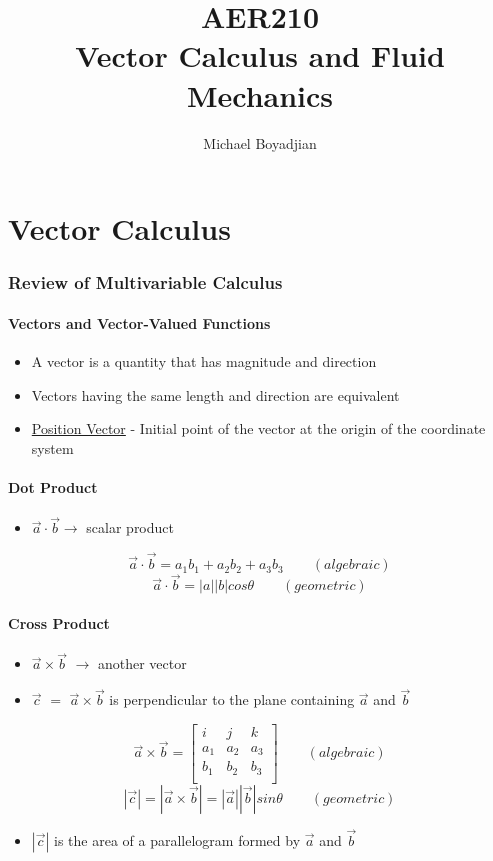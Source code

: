 \documentclass[11pt]{article}
\begin{document}
\title{AER210 \\ Vector Calculus and Fluid Mechanics}
\author{Michael Boyadjian}
\maketitle
\pagebreak

\tableofcontents

\pagebreak
\part{Vector Calculus}
\section{Review of Multivariable Calculus}
\subsection{Vectors and Vector-Valued Functions}
\begin{itemize}
\item A vector is a quantity that has magnitude and direction
\item Vectors having the same length and direction are equivalent
\item \underline{Position Vector} - Initial point of the vector at the origin of the coordinate system
\end{itemize}

\subsection{Dot Product}
\begin{itemize}
\item $ \vec{a} \cdot \vec{b} \rightarrow$ scalar product
\end{itemize}
$$ \vec{a} \cdot \vec{b} = a_1b_1 + a_2b_2 + a_3b_3 \quad \quad (algebraic)$$
$$ \vec{a} \cdot \vec{b} = |a||b|cos\theta \quad \quad (geometric)$$

\subsection{Cross Product}
\begin{itemize}
\item $\vec{a} \times \vec{b} $ $\rightarrow$ another vector
\item $\vec{c}$ $=$ $\vec{a} \times \vec{b}$ is perpendicular to the plane containing $\vec{a}$ and $\vec{b}$
\end{itemize}
$$
\vec{a}\times \vec{b} = 
\begin{bmatrix}
i&j&k \\
a_1&a_2&a_3 \\
b_1&b_2&b_3 \\
\end{bmatrix}
\quad \quad
(algebraic)
$$
\smallskip
$$
|\vec{c}| = |\vec{a}\times \vec{b}| = |\vec{a}||\vec{b}|sin\theta \quad \quad (geometric)
$$
\begin{itemize}
\item $|\vec{c}|$ is the area of a parallelogram formed by $\vec{a}$ and $\vec{b}$
\end{itemize}
\end{document}
